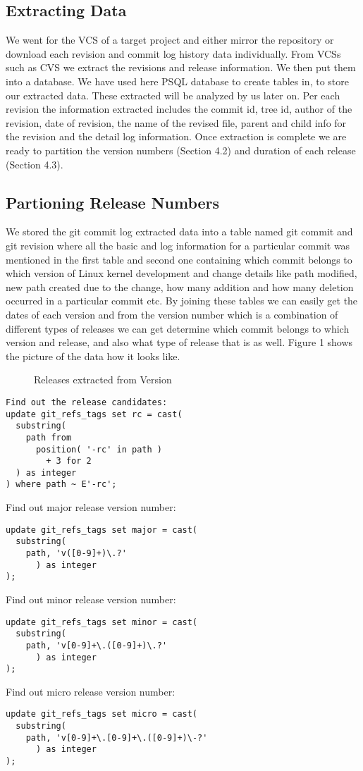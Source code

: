 \documentclass{acm_proc_article-sp}
\begin{document}
\subsection{Extracting Data}
We went for the VCS of a target project and either mirror the repository or download each revision and commit log history data individually. From VCSs such as CVS we extract the revisions and release information. We then put them into a database. We have used here PSQL database to create tables in, to store our extracted data. These extracted will be analyzed by us later on. Per each revision the information extracted includes the commit id, tree id, author of the revision, date of revision, the name of the revised file, parent and child info for the revision and the detail log information. Once extraction is complete we are ready to partition the version numbers (Section 4.2) and duration  of each release (Section 4.3).

\subsection{Partioning Release Numbers}
We stored the git commit log extracted data into a table named git commit and git revision where all the basic and log information for a particular commit was mentioned in the first table and second one containing which commit belongs to which version of Linux kernel development and change details like path modified, new path created due to the change, how many addition and how many deletion occurred in a particular commit etc. By joining these tables we can easily get the dates of each version and from the version number which is a combination of different types of releases we can get determine which commit belongs to which version and release, and also what type of release that is as well. Figure 1 shows the picture of the data how it looks like.
\begin{figure}
\centering
{}
\caption{Releases extracted from Version}
\end{figure}

\begin{lstlisting}
Find out the release candidates:
update git_refs_tags set rc = cast(
  substring(
    path from
      position( '-rc' in path )
        + 3 for 2 
  ) as integer
) where path ~ E'-rc';
\end{lstlisting}
Find out major release version number:
\begin{lstlisting}
update git_refs_tags set major = cast(
  substring(
    path, 'v([0-9]+)\.?'
      ) as integer
);
\end{lstlisting}
Find out minor release version number:
\begin{lstlisting}
update git_refs_tags set minor = cast(
  substring(
    path, 'v[0-9]+\.([0-9]+)\.?'
      ) as integer
);
\end{lstlisting}
Find out micro release version number:
\begin{lstlisting}
update git_refs_tags set micro = cast(
  substring(
    path, 'v[0-9]+\.[0-9]+\.([0-9]+)\-?'
      ) as integer
);
\end{lstlisting}
\end{document}
